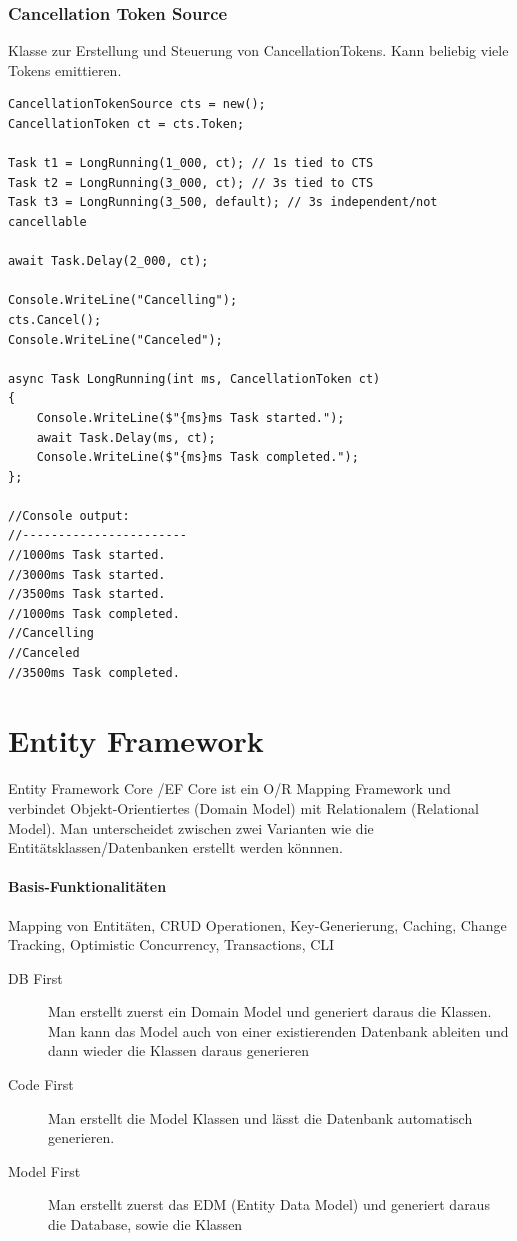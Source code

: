 \documentclass[
a4paper,
oneside,
10pt,
fleqn,
headsepline,
toc=listofnumbered, 
bibliography=totocnumbered]{scrartcl}
\let\stdsection\section
\renewcommand\section{\clearpage\stdsection}
\begin{document}
\subsubsection{Cancellation Token Source}
Klasse zur Erstellung und Steuerung von CancellationTokens. Kann beliebig viele Tokens emittieren.
\begin{lstlisting}
CancellationTokenSource cts = new();
CancellationToken ct = cts.Token;

Task t1 = LongRunning(1_000, ct); // 1s tied to CTS
Task t2 = LongRunning(3_000, ct); // 3s tied to CTS
Task t3 = LongRunning(3_500, default); // 3s independent/not cancellable

await Task.Delay(2_000, ct);

Console.WriteLine("Cancelling");
cts.Cancel();
Console.WriteLine("Canceled");

async Task LongRunning(int ms, CancellationToken ct)
{
	Console.WriteLine($"{ms}ms Task started.");
	await Task.Delay(ms, ct);
	Console.WriteLine($"{ms}ms Task completed.");
};

//Console output:
//-----------------------
//1000ms Task started.
//3000ms Task started.
//3500ms Task started.
//1000ms Task completed.
//Cancelling
//Canceled
//3500ms Task completed.
\end{lstlisting}

\section{Entity Framework}
Entity Framework Core /EF Core ist ein O/R Mapping Framework und verbindet Objekt-Orientiertes (Domain Model) mit Relationalem (Relational Model). Man unterscheidet zwischen zwei Varianten wie die Entitätsklassen/Datenbanken erstellt werden könnnen.
\paragraph{Basis-Funktionalitäten} Mapping von Entitäten, CRUD Operationen, Key-Generierung, Caching, Change Tracking, Optimistic Concurrency, Transactions, CLI
\begin{description}
	\item[DB First] Man erstellt zuerst ein Domain Model und generiert daraus die Klassen. Man kann das Model auch von einer existierenden Datenbank ableiten und dann wieder die Klassen daraus generieren
	\item[Code First] Man erstellt die Model Klassen und lässt die Datenbank automatisch generieren.
	\item[Model First] Man erstellt zuerst das EDM (Entity Data Model) und generiert daraus die Database, sowie die Klassen
\end{description}
\end{document}

